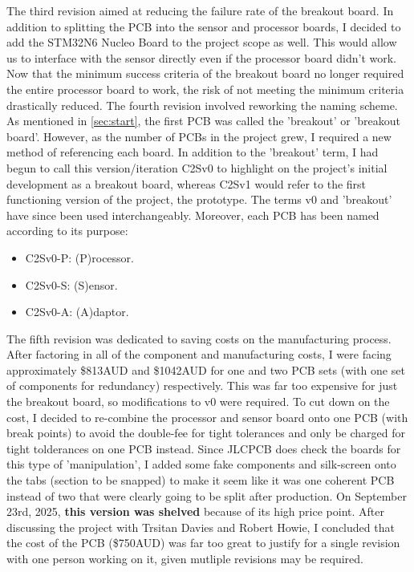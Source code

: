 \nl
The third revision aimed at reducing the failure rate of the breakout board. In addition to splitting the PCB into the sensor and processor boards, I decided to add the STM32N6 Nucleo Board to the project scope as well. This would allow us to interface with the sensor directly even if the processor board didn't work.
Now that the minimum success criteria of the breakout board no longer required the entire processor board to work, the risk of not meeting the minimum criteria drastically reduced.
\nl
The fourth revision involved reworking the naming scheme. As mentioned in \autoref{sec:start}, the first PCB was called the 'breakout' or 'breakout board'. However, as the number of PCBs in the project grew, I required a new method of referencing each board.
In addition to the 'breakout' term, I had begun to call this version/iteration C2Sv0 to highlight on the project's initial development as a breakout board, whereas C2Sv1 would refer to the first functioning version of the project, the prototype. The terms v0 and 'breakout' have since been used interchangeably.
Moreover, each PCB has been named according to its purpose:
\begin{itemize}
    \item C2Sv0-P: (P)rocessor.
    \item C2Sv0-S: (S)ensor.
    \item C2Sv0-A: (A)daptor.
\end{itemize}
The fifth revision was dedicated to saving costs on the manufacturing process. After factoring in all of the component and manufacturing costs, I were facing approximately \$813AUD and \$1042AUD for one and two PCB sets (with one set of components for redundancy) respectively.
This was far too expensive for just the breakout board, so modifications to v0 were required. To cut down on the cost, I decided to re-combine the processor and sensor board onto one PCB (with break points) to avoid the double-fee for tight tolerances and only be charged for tight tolderances on one PCB instead.
Since JLCPCB does check the boards for this type of 'manipulation', I added some fake components and silk-screen onto the tabs (section to be snapped) to make it seem like it was one coherent PCB instead of two that were clearly going to be split after production.
\nl
On September 23rd, 2025, \textbf{this version was shelved} because of its high price point. After discussing the project with Trsitan Davies and Robert Howie, I concluded that the cost of the PCB (\$750AUD) was far too great to justify for a single revision with one person working on it, given mutliple revisions may be required.
